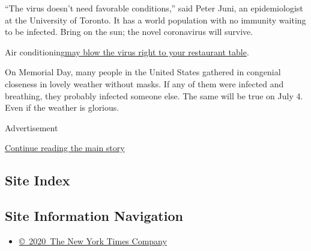 ``The virus doesn't need favorable conditions,'' said Peter Juni, an
epidemiologist at the University of Toronto. It has a world population
with no immunity waiting to be infected. Bring on the sun; the novel
coronavirus will survive.

Air
conditioning\href{https://www.nytimes3xbfgragh.onion/2020/04/20/health/airflow-coronavirus-restaurants.html}{may
blow the virus right to your restaurant table}.

On Memorial Day, many people in the United States gathered in congenial
closeness in lovely weather without masks. If any of them were infected
and breathing, they probably infected someone else. The same will be
true on July 4. Even if the weather is glorious.

Advertisement

\protect\hyperlink{after-bottom}{Continue reading the main story}

\hypertarget{site-index}{%
\subsection{Site Index}\label{site-index}}

\hypertarget{site-information-navigation}{%
\subsection{Site Information
Navigation}\label{site-information-navigation}}

\begin{itemize}
\tightlist
\item
  \href{https://help.nytimes3xbfgragh.onion/hc/en-us/articles/115014792127-Copyright-notice}{©~2020~The
  New York Times Company}
\end{itemize}

